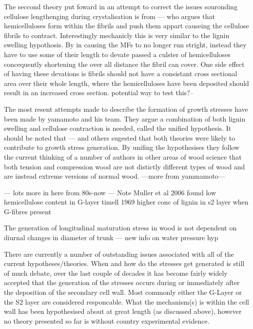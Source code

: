 \documentclass{article}
\begin{document}
The seccond theory put foward in an attempt to correct the issues souronding
cellulose lengthenging during crystalisation is from --- who argues that
hemicelluloses form within the fibrils and push them appart causeing the
cellulose fibrils to contract. Interestingly mechanicly this is very similar to
the lignin swelling hypothosis. By in causing the MFs to no longer run stright,
instead they have to use some of their length to devate passed a culster of
hemicelluloses concequently shortening the over all distance the fibril can
cover. One side effect of having these devations is fibrils should not have a
consistant cross sectional area over their whole length, where the
hemicelluloses have been deposited should result in an increased cross section.
potential way to test this?--

The most resent attempts made to describe the formation of growth stresses have
been made by yamamoto and his team. They argue a combination of both lignin
swelling and cellulose contraction is needed, called the unified hypothesis. It
should be noted that --- and others sugested that both theories were likely to
contribute to growth stress generation. By unifing the hypothesises they follow
the current thinking of a number of authors in other areas of wood science that
both tension and compression wood are not distictly different types of wood and
are instead extreme versions of normal wood. ---more from yammamoto---


--- lots more in here from 80s-now ---
Note Muller et al 2006 found low hemicellulose content in G-layer
timell 1969 higher conc of lignin in s2 layer when G-fibres present

The generation of longitudinal maturation stress in wood is not dependent on
diurnal changes in diameter of trunk --- new info on water pressure hyp

There are currently a number of outstanding issues associated with all
of the current hypotheses/theories. When and how do the stresses get
generated is still of much debate, over the last couple of decades it has become
fairly widely accepted that the generation of the stresses occurs during or
immediately after the deposition of the secondary cell wall. Most commonly either
the G-Layer or the S2 layer are considered responcable. What the mechanism(s)
is within the cell wall has been hypothesised about at great length (as
discussed above), however no theory presented so far is without country
experimental evidence.
\end{document}
